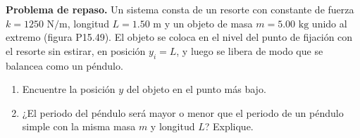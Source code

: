 \item \textbf{Problema de repaso.}
Un sistema consta de un resorte con constante de fuerza $k = 1250\text{ N/m}$, longitud $L = 1.50\text{ m}$ y un objeto de masa $m = 5.00\text{ kg}$ unido al extremo (figura P15.49). El objeto se coloca en el nivel del punto de fijación con el resorte sin estirar, en posición $y_i = L$, y luego se libera de modo que se balancea como un péndulo.
\begin{enumerate}
    \item Encuentre la posición $y$ del objeto en el punto más bajo.
    \item ¿El periodo del péndulo será mayor o menor que el periodo de un péndulo simple con la misma masa $m$ y longitud $L$? Explique.
\end{enumerate}
